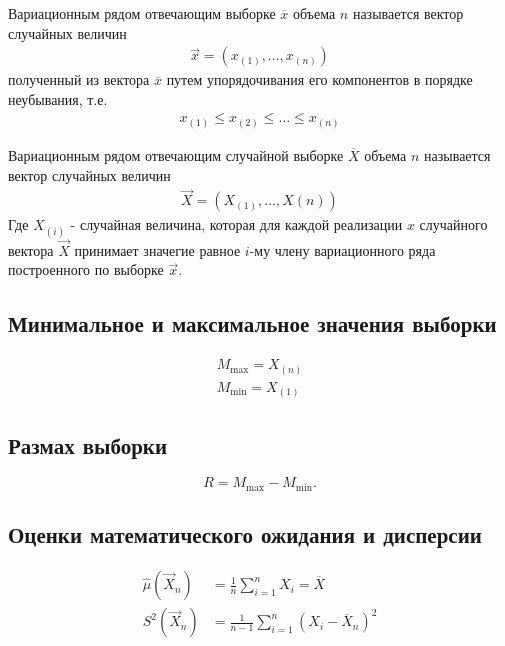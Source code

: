 Вариационным рядом отвечающим выборке $\overline{x}$ объема $n$ называется вектор случайных величин
\begin{equation}
    \begin{aligned}
        \vec{x} = (x_{(1)}, \dots, x_{(n)})
    \end{aligned}
\end{equation}
полученный из вектора $\overline{x}$ путем упорядочивания его компонентов в порядке неубывания, т.е.
\begin{equation}
    \begin{aligned}
        x_{(1)} \leq x_{(2)} \leq \dots \leq x_{(n)}
    \end{aligned}
\end{equation}

Вариационным рядом отвечающим случайной выборке $\overline{X}$ объема $n$ называется вектор случайных величин
\begin{equation}
    \begin{aligned}
        \vec{X} = (X_{(1)}, \dots, X{(n)})
    \end{aligned}
\end{equation}
Где $X_{(i)}$ - случайная величина, которая для каждой реализации $x$ случайного вектора $\vec{X}$ принимает значегие равное $i$-му члену вариационного ряда построенного по выборке $\vec{x}$.

\subsection{Минимальное и максимальное значения выборки}
\begin{equation}
    \begin{aligned}
        M_{\max} = X_{(n)}\\
        M_{\min} = X_{(1)}
    \end{aligned}
\end{equation}

\subsection{Размах выборки}
\begin{equation}
    R = M_{\max} - M_{\min}.
\end{equation}

\subsection{Оценки математического ожидания и дисперсии}
\begin{equation}
    \begin{aligned}
    \hat\mu(\vec X_n) &= \frac 1n \sum_{i=1}^n X_i = \overline{X}\\
    S^2(\vec X_n) &= \frac 1{n-1} \sum_{i=1}^n (X_i-\overline X_n)^2
    \end{aligned}
\end{equation}

